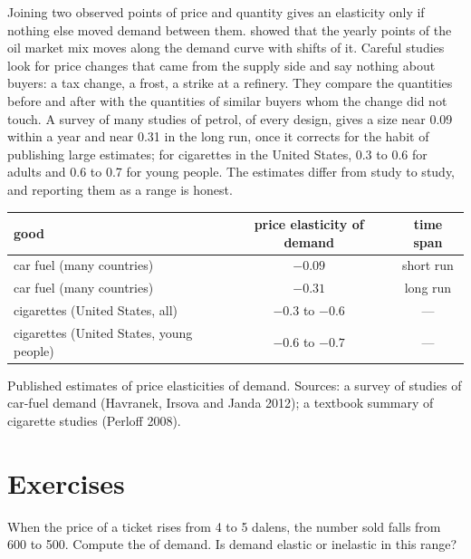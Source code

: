 \begin{measure}
Joining two observed points of price and quantity gives an elasticity only if nothing else moved demand between them.  showed
that the yearly points of the oil market mix moves along the demand curve with shifts of it. Careful studies look for price changes that came from
the supply side and say nothing about buyers: a tax change, a frost, a strike at a refinery. They compare the quantities before and after with the
quantities of similar buyers whom the change did not touch. A survey of many studies of petrol, of every design, gives a size near 0.09 within a year and
near 0.31 in the long run, once it corrects for the habit of publishing large estimates; for cigarettes in the United States, 0.3 to 0.6 for adults and 0.6 to 0.7 for young people. The estimates differ from
study to study, and reporting them as a range is honest.
\end{measure}

\begin{omfigure}
\small
\begin{tabular}{l c c}
\toprule
good & price elasticity of demand & time span \\
\midrule
car fuel (many countries) & $-0.09$ & short run \\
car fuel (many countries) & $-0.31$ & long run \\
cigarettes (United States, all) & $-0.3$ to $-0.6$ & --- \\
cigarettes (United States, young people) & $-0.6$ to $-0.7$ & --- \\
\bottomrule
\end{tabular}

{\small Published estimates of price elasticities of demand. Sources: a survey of studies of car-fuel demand (Havranek, Irsova and Janda 2012);
a textbook summary of cigarette studies (Perloff 2008).}
\end{omfigure}

\section{Exercises}

\begin{exercise}[$\star$]\label{exo:g10:elasticities:1}
When the price of a ticket rises from 4 to 5 dalens, the number sold falls from 600 to 500. Compute the  of demand. Is demand elastic
or inelastic in this range?
\end{exercise}

